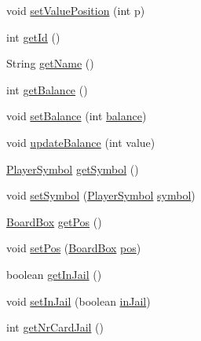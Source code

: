 \begin{DoxyCompactItemize}
void \hyperlink{class_monopoly_1_1_logic_1_1_player_a417294d3211a47bedafd5b86880f37d4}{set\+Value\+Position} (int p)
\item 
int \hyperlink{class_monopoly_1_1_logic_1_1_player_a02e6e0237ee7b4c32c58d3a2c8020b39}{get\+Id} ()
\item 
String \hyperlink{class_monopoly_1_1_logic_1_1_player_a485b4c3a2c25f882e4826e16a458d7cb}{get\+Name} ()
\item 
int \hyperlink{class_monopoly_1_1_logic_1_1_player_ab4617809f84d2bb5f6393c6414a1bb07}{get\+Balance} ()
\item 
void \hyperlink{class_monopoly_1_1_logic_1_1_player_affbd1fd7e079708a5365a99c9ad1d20e}{set\+Balance} (int \hyperlink{class_monopoly_1_1_logic_1_1_player_adee3b4a4dea242b17568e6d93922a698}{balance})
\item 
void \hyperlink{class_monopoly_1_1_logic_1_1_player_a84dc1edd89e49ed5565b3e8ecbde66fa}{update\+Balance} (int value)
\item 
\hyperlink{class_monopoly_1_1_logic_1_1_player_symbol}{Player\+Symbol} \hyperlink{class_monopoly_1_1_logic_1_1_player_a8676c33cac02c3b2e17c63b06d40ac6c}{get\+Symbol} ()
\item 
void \hyperlink{class_monopoly_1_1_logic_1_1_player_af93d16184072a94055b2cc77d4075028}{set\+Symbol} (\hyperlink{class_monopoly_1_1_logic_1_1_player_symbol}{Player\+Symbol} \hyperlink{class_monopoly_1_1_logic_1_1_player_a0171902866c205d6dfbd11e89ede9ac3}{symbol})
\item 
\hyperlink{class_monopoly_1_1_logic_1_1_board_box}{Board\+Box} \hyperlink{class_monopoly_1_1_logic_1_1_player_a6bb88db582618a97cce059fec9f0f69f}{get\+Pos} ()
\item 
void \hyperlink{class_monopoly_1_1_logic_1_1_player_a83d2f536bf04e85f64c1c4b8919e3b43}{set\+Pos} (\hyperlink{class_monopoly_1_1_logic_1_1_board_box}{Board\+Box} \hyperlink{class_monopoly_1_1_logic_1_1_player_a94388e91629f1f055fed991fd202e1b8}{pos})
\item 
boolean \hyperlink{class_monopoly_1_1_logic_1_1_player_a998ce119ac6845284fc8d52a2d35356e}{get\+In\+Jail} ()
\item 
void \hyperlink{class_monopoly_1_1_logic_1_1_player_ad430c406fde2055804d7ad120eab63d8}{set\+In\+Jail} (boolean \hyperlink{class_monopoly_1_1_logic_1_1_player_a97afe5ab76ab1b1377a9e8243643fcb6}{in\+Jail})
\item 
int \hyperlink{class_monopoly_1_1_logic_1_1_player_ad21e0836ab5c9c2856b0109c0e701b40}{get\+Nr\+Card\+Jail} ()
\item 

\end{DoxyCompactItemize}
